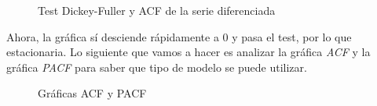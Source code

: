 \begin{figure}[H]
	\centering
	\caption{Test Dickey-Fuller y ACF de la serie diferenciada}
	\label{fig:9}
\end{figure}

Ahora, la gráfica sí desciende rápidamente a 0 y pasa el test, por lo que estacionaria. Lo siguiente que vamos a hacer es analizar la gráfica \textit{ACF} y la gráfica \textit{PACF} para saber que tipo de modelo se puede utilizar.

\begin{figure}[H]
	\centering
	\caption{Gráficas ACF y PACF}
	\label{fig:10}
\end{figure}


